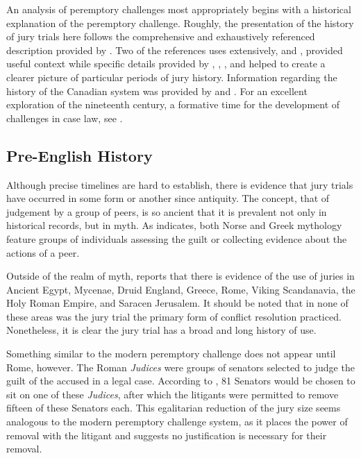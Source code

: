 An analysis of peremptory challenges most appropriately begins with a historical explanation of the peremptory challenge. Roughly,
the presentation of the history of jury trials here follows the comprehensive and exhaustively referenced description provided by
\cite{hoffman1997}. Two of the references \citeauthor{hoffman1997} uses extensively, \cite{hansvidjudging} and
\cite{vandykejurysel}, provided useful context while specific details provided by \cite{vonmosch1921}, \cite{forsythhistory},
\cite{brown1978}, and \cite{brown2000} helped to create a clearer picture of particular periods of jury history. Information
regarding the history of the Canadian system was provided by \cite{brown2000} and \cite{petersen1993}. For an excellent
exploration of the nineteenth century, a formative time for the development of challenges in case law, see \cite{brown2000}.

\subsection{Pre-English History}

Although precise timelines are hard to establish, there is evidence that jury trials have occurred in some form or another since
antiquity. The concept, that of judgement by a group of peers, is so ancient that it is prevalent not only in historical records,
but in myth. As \cite{hoffman1997} indicates, both Norse and Greek mythology feature groups of individuals assessing the guilt or
collecting evidence about the actions of a peer.

Outside of the realm of myth, \cite{hoffman1997} reports that there is evidence of the use of juries in Ancient Egypt, Mycenae,
Druid England, Greece, Rome, Viking Scandanavia, the Holy Roman Empire, and Saracen Jerusalem. It should be noted that in none of
these areas was the jury trial the primary form of conflict resolution practiced. Nonetheless, it is clear the jury trial has a
broad and long history of use.

Something similar to the modern peremptory challenge does not appear until Rome, however. The Roman \textit{Judices} were groups
of senators selected to judge the guilt of the accused in a legal case. According to \cite{hoffman1997}, 81 Senators would be
chosen to sit on one of these \textit{Judices}, after which the litigants were permitted to remove fifteen of these Senators
each. This egalitarian reduction of the jury size seems analogous to the modern peremptory challenge system, as it places the
power of removal with the litigant and suggests no justification is necessary for their removal.

